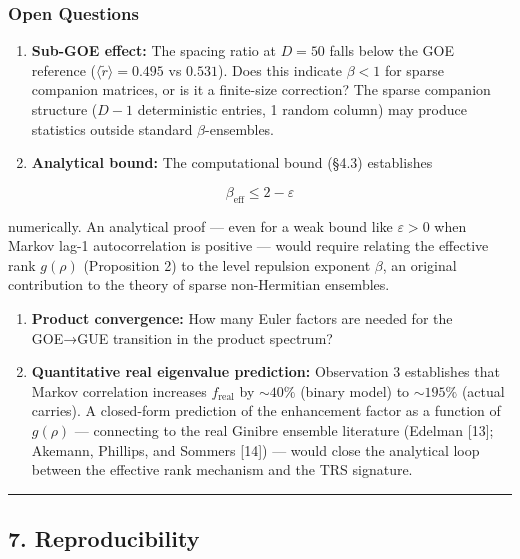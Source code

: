 \documentclass[
  11pt,
]{article}
\begin{document}
\subsubsection{Open Questions}\label{open-questions}

\begin{enumerate}
\def\labelenumi{\arabic{enumi}.}
\item
  \textbf{Sub-GOE effect:} The spacing ratio at \(D = 50\) falls below the GOE
  reference (\(\langle\tilde{r}\rangle = 0.495\) vs \(0.531\)). Does this
  indicate \(\beta < 1\) for sparse companion matrices, or is it a finite-size
  correction? The sparse companion structure (\(D-1\) deterministic entries, 1
  random column) may produce statistics outside standard \(\beta\)-ensembles.
\item
  \textbf{Analytical bound:} The computational bound (§4.3) establishes
\end{enumerate}

\[\beta_{\mathrm{eff}} \leq 2 - \varepsilon\]

numerically. An analytical proof --- even for a weak bound like
\(\varepsilon > 0\) when Markov lag-1 autocorrelation is positive --- would
require relating the effective rank \(g(\rho)\) (Proposition 2) to the level
repulsion exponent \(\beta\), an original contribution to the theory of sparse
non-Hermitian ensembles.

\begin{enumerate}
\def\labelenumi{\arabic{enumi}.}
\setcounter{enumi}{2}
\item
  \textbf{Product convergence:} How many Euler factors are needed for the
  GOE→GUE transition in the product spectrum?
\item
  \textbf{Quantitative real eigenvalue prediction:} Observation 3 establishes
  that Markov correlation increases \(f_{\mathrm{real}}\) by \({\sim}40\%\)
  (binary model) to \({\sim}195\%\) (actual carries). A closed-form prediction
  of the enhancement factor as a function of \(g(\rho)\) --- connecting to the
  real Ginibre ensemble literature (Edelman {[}13{]}; Akemann, Phillips, and
  Sommers {[}14{]}) --- would close the analytical loop between the effective
  rank mechanism and the TRS signature.
\end{enumerate}

\begin{center}\rule{0.5\linewidth}{0.5pt}\end{center}

\newpage

\subsection{7. Reproducibility}\label{reproducibility}
\end{document}
